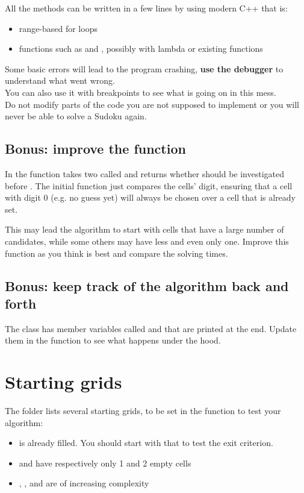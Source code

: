 \documentclass{ecnreport}
\begin{document}
 All the methods can be written in a few lines by using modern C++ that is:
 \begin{itemize}
  \item range-based for loops
  \item {} functions such as  and , possibly with lambda or existing functions
 \end{itemize}

 Some basic errors will lead to the program crashing, {\bf use the debugger} to understand what went wrong.
\\
You can also use it with breakpoints to see what is going on in this mess.\\

Do not modify parts of the code you are not supposed to implement or you will never be able to solve a Sudoku again.


\newpage


\subsection{Bonus: improve the  function}

In  the  function takes two \Cell called  and returns whether  should be investigated before . The initial function just compares the cells' digit, ensuring that a cell with digit 0 (e.g. no guess yet) will always be chosen over a cell that is already set.

This may lead the algorithm to start with cells that have a large number of candidates, while some others may have less and even only one. Improve this function as you think is best and compare the solving times.

\subsection{Bonus: keep track of the algorithm back and forth}

The \Grid class has member variables called  and  that are printed at the end. Update them in the  function to see what happens under the hood.


\section{Starting grids}

The  folder lists several starting grids, to be set in the  function to test your algorithm:
\begin{itemize}
 \item {} is already filled. You should start with that to test the exit criterion.
 \item {} and  have respectively only 1 and 2 empty cells
 \item {}, ,  and  are of increasing complexity
\end{itemize}
\end{document}
